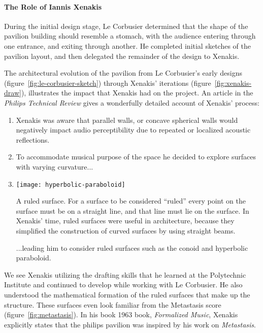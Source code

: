 \paragraph{The Role of Iannis Xenakis} During the initial design stage,
Le Corbusier determined that the shape of the pavilion building should
resemble a stomach, with the audience entering through one entrance,
and exiting through another. He completed initial sketches of the
pavilion layout, and then delegated the remainder of the design to
Xenakis.\cite{Clarke2012}

The architectural evolution of the pavilion from Le Corbusier's early
designs (figure~\ref{fig:le-corbusier-sketch}) through Xenakis'
iterations (figure~\ref{fig:xenakis-draw}), illustrates the impact
that Xenakis had on the project. An article in the \textit{Philips
  Technical Review}\cite{philips1958} gives a wonderfully detailed
account of Xenakis' process:
\begin{enumerate}
\item Xenakis was aware that parallel walls, or concave spherical
  walls would negatively impact audio perceptibility due to repeated
  or localized acoustic reflections.
\item To accommodate musical purpose of the space he decided to
  explore surfaces with varying curvature...
\item 
  \begin{marginfigure}
    \texttt{[image: hyperbolic-paraboloid]}
    \caption{A ruled surface. For a surface to be considered ``ruled''
      every point on the surface must be on a straight line, and that
      line must lie on the surface. In Xenakis' time, ruled surfaces
      were useful in architecture, because they simplified the
      construction of curved surfaces by using straight beams.}
    \label{fig:ruled-surface}
  \end{marginfigure}...leading him to consider ruled surfaces such as
  the conoid and hyperbolic paraboloid. 
\end{enumerate}
We see Xenakis utilizing the drafting skills that he learned at the
Polytechnic Institute and continued to develop while working with Le
Corbusier. He also understood the mathematical formation of the ruled
surfaces that make up the structure. These surfaces even look familiar
from the Metastasis score (figure~\ref{fig:metastasis}). In his book
1963 book, \textit{Formalized Music}, Xenakis explicitly states that
the philips pavilion was inspired by his work on
\textit{Metastasis}.

